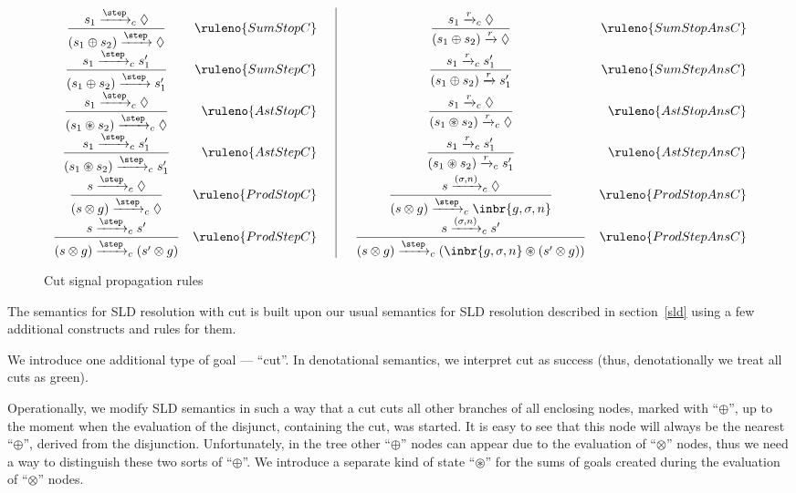 \begin{figure*}[t]
\[
\begin{array}{crc|ccr}
  \dfrac{s_1 \xrightarrow{\step}_c \Diamond}{(s_1 \oplus s_2) \xrightarrow{\step} \Diamond} & \ruleno{SumStopC}& & &
  \dfrac{s_1 \xrightarrow{r}_c \Diamond}{(s_1 \oplus s_2) \xrightarrow{r} \Diamond} & \ruleno{SumStopAnsC}\\
  \dfrac{s_1 \xrightarrow{\step}_c s'_1}{(s_1 \oplus s_2) \xrightarrow{\step} s'_1} &\ruleno{SumStepC}& & &
  \dfrac{s_1 \xrightarrow{r}_c s'_1}{(s_1 \oplus s_2) \xrightarrow{r} s'_1} &\ruleno{SumStepAnsC}\\
  \dfrac{s_1 \xrightarrow{\step}_c \Diamond}{(s_1 \circledast s_2) \xrightarrow{\step}_c \Diamond} & \ruleno{AstStopC}& & &
  \dfrac{s_1 \xrightarrow{r}_c \Diamond}{(s_1 \circledast s_2) \xrightarrow{r}_c \Diamond} & \ruleno{AstStopAnsC}\\
  \dfrac{s_1 \xrightarrow{\step}_c s'_1}{(s_1 \circledast s_2) \xrightarrow{\step}_c s'_1} &\ruleno{AstStepC}& & &
  \dfrac{s_1 \xrightarrow{r}_c s'_1}{(s_1 \circledast s_2) \xrightarrow{r}_c s'_1} &\ruleno{AstStepAnsC}\\
  \dfrac{s \xrightarrow{\step}_c \Diamond}{(s \otimes g) \xrightarrow{\step}_c \Diamond} & \ruleno{ProdStopC}& & &
  \dfrac{s \xrightarrow{(\sigma, n)}_c \Diamond}{(s \otimes g) \xrightarrow{\step}_c \inbr{g, \sigma, n}} & \ruleno{ProdStopAnsC}\\
  \dfrac{s \xrightarrow{\step}_c s'}{(s \otimes g) \xrightarrow{\step}_c (s' \otimes g)} &\ruleno{ProdStepC}& & &
  \dfrac{s \xrightarrow{(\sigma, n)}_c s'}{(s \otimes g) \xrightarrow{\step}_c (\inbr{g, \sigma, n} \circledast (s' \otimes g))} &\ruleno{ProdStepAnsC}
\end{array}
\]
\caption{Cut signal propagation rules}
\label{cut-signal-propagation}
\end{figure*}

The semantics for SLD resolution with cut is built upon our usual semantics for SLD resolution described in section~\ref{sld} using a few additional constructs and rules for them.

We introduce one additional type of goal --- ``cut''. In denotational semantics, we interpret cut as success (thus, denotationally we treat all cuts as green).

Operationally, we modify SLD semantics in such a way that a cut cuts all other branches of all enclosing nodes, marked with ``$\oplus$'', up to
the moment when the evaluation of the disjunct, containing the cut, was started. It is easy to see that this node will always
be the nearest ``$\oplus$'', derived from the disjunction. Unfortunately, in the tree other ``$\oplus$'' nodes can
appear due to the evaluation of ``$\otimes$'' nodes, thus we need a way to distinguish these two sorts of ``$\oplus$''. We introduce a separate kind of state ``$\circledast$'' for the sums of goals created during the evaluation of ``$\otimes$'' nodes.

